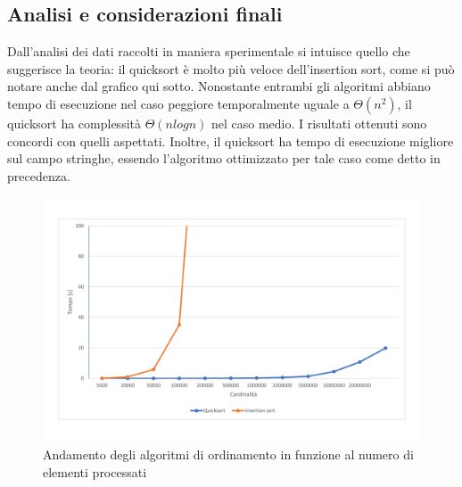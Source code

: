 \subsection{Analisi e considerazioni finali}
Dall'analisi dei dati raccolti in maniera sperimentale si intuisce quello che suggerisce la teoria: il quicksort è molto più veloce dell'insertion sort, come si può notare anche dal grafico qui sotto. Nonostante entrambi gli algoritmi abbiano tempo di esecuzione nel caso peggiore temporalmente uguale a $\Theta(n^2)$, il quicksort ha complessità $\Theta(n log n)$ nel caso medio. I risultati ottenuti sono concordi con quelli aspettati. \newline Inoltre, il quicksort ha tempo di esecuzione migliore sul campo stringhe, essendo l'algoritmo ottimizzato per tale caso come detto in precedenza.
\begin{figure}[h]
\centering
\includegraphics[trim = 21mm 30mm 56mm 37mm, clip, width=14cm]{graph.pdf}
\caption*{Andamento degli algoritmi di ordinamento in funzione al numero di elementi processati}
\label{fig:domaine}
\end{figure}